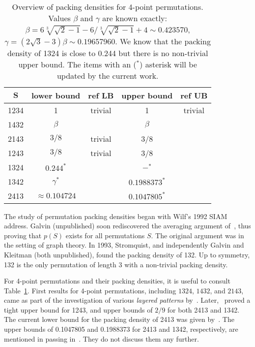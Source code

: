 \begin{table}[ht]
\centering
\begin{tabular}{|c | c | c | c | c|}
\hline
$\mathbf{S}$ & \textbf{lower bound} & \textbf{ref LB} & \textbf{upper bound} & \textbf{ref UB}\\
\hline\hline
1234 & 1 & trivial & 1 & trivial\\
\hline
1432 & $\beta$ & \cite{price1997packing} & $\beta$ & \cite{price1997packing}\\
\hline
2143 & $3/8$ & trivial & 3/8 & \cite{price1997packing}\\
\hline
1243 & $3/8$ & trivial & 3/8 & \cite{albert2002packing}\\
\hline
1324 & $0.244^*$ & \cite{price1997packing} & $ -^* $ & \cite{price1997packing}\\
\hline
1342 & $\gamma^*$ & \cite{batkeyev} & $0.1988373^*$ & \cite{balogh2015minimum}\\
\hline
2413 & $\approx 0.104724$ & \cite{presutti2010packing} & $0.1047805^*$ & \cite{balogh2015minimum}\\
\hline
\end{tabular}
\caption{\small{Overview of packing densities for 4-point permutations. Values $\beta$ and $\gamma$ are known exactly: $\beta = 6\sqrt[3]{\sqrt{2}-1}-6/\sqrt[3]{\sqrt{2}-1}+4 \sim 0.423570$, $\gamma = (2\sqrt{3}-3)\beta \sim 0.19657960$. We know that the packing density of 1324 is close to 0.244 but there is no non-trivial upper bound. The items with an ($^*$) asterisk will be updated by the current work.}}
\label{tab:overview}
\end{table}

The study of permutation packing densities began with Wilf's 1992 SIAM address. Galvin (unpublished) soon rediscovered the averaging argument of~\cite{katona1964exists}, thus proving that $p(S)$ exists for all permutations $S$. The original argument was in the setting of graph theory. In 1993, Stromquist, and independently Galvin and Kleitman (both unpublished), found the packing density of 132. Up to symmetry, 132 is the only permutation of length 3 with a non-trivial packing density.

For 4-point permutations and their packing densities, it is useful to consult Table~\ref{tab:overview}. First results for 4-point permutations, including $1324$, $1432$, and $2143$, came as part of the investigation of various \emph{layered patterns} by~\cite{price1997packing}. Later,~\cite{albert2002packing} proved a tight upper bound for 1243, and upper bounds of $2/9$ for both 2413 and 1342. The current lower bound for the packing density of 2413 was given by~\cite{presutti2010packing}. The upper bounds of 0.1047805 and 0.1988373 for 2413 and 1342, respectively, are mentioned in passing in~\cite{balogh2015minimum}. They do not discuss them any further.

